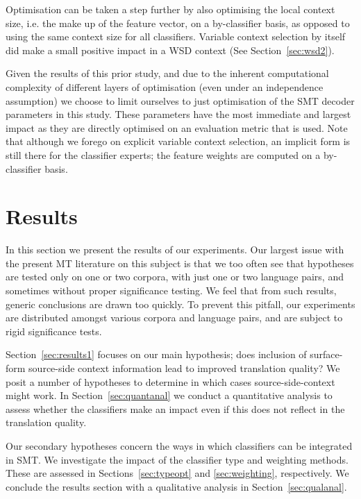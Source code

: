 Optimisation can be taken a step further by also optimising the local context
size, i.e. the make up of the feature vector, on a by-classifier basis, as
opposed to using the same context size for all classifiers.  Variable context selection by itself
did make a small positive impact in a WSD context (See Section~\ref{sec:wsd2}).

Given the results of this prior study, and due to the inherent computational
complexity of different layers of optimisation (even under an independence
assumption) we choose to limit ourselves to just optimisation of the SMT
decoder parameters in this study. These parameters have the most immediate and
largest impact as they are directly optimised on an evaluation metric that is
used.  Note that although we forego on explicit variable context selection, an
implicit form is still there for the classifier experts; the feature weights
are computed on a by-classifier basis.

\section{Results}
\label{sec:results}

In this section we present the results of our experiments.  Our largest
issue with the present MT literature on this subject is that we too often see
that hypotheses are tested only on one or two corpora, with just one or two
language pairs, and sometimes without proper significance testing. We feel that
from such results, generic conclusions are drawn too quickly. To prevent this
pitfall, our experiments are distributed amongst various corpora and language
pairs, and are subject to rigid significance tests.

Section~\ref{sec:results1} focuses on our main hypothesis; does inclusion of
surface-form source-side context information lead to improved translation
quality?  We posit a number of hypotheses to determine in which cases
source-side-context might work. In Section~\ref{sec:quantanal} we conduct a
quantitative analysis to assess whether the classifiers make an impact even if
this does not reflect in the translation quality.

Our secondary hypotheses concern the ways in which classifiers can be
integrated in SMT. We investigate the impact of the classifier type and
weighting methods.  These are assessed in Sections~\ref{sec:typeopt} and
\ref{sec:weighting}, respectively. We conclude the results section with a
qualitative analysis in Section~\ref{sec:qualanal}.

